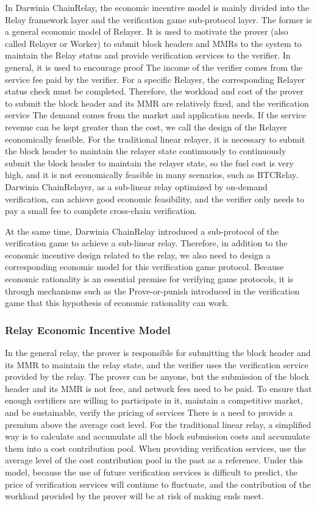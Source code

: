 In Darwinia ChainRelay, the economic incentive model is mainly divided into the Relay framework layer and the verification game sub-protocol layer.
The former is a general economic model of Relayer. It is used to motivate the prover (also called Relayer or Worker) to submit block headers and MMRs to the system to maintain the Relay status and provide verification services to the verifier. In general, it is used to encourage proof The income of the verifier comes from the service fee paid by the verifier. For a specific Relayer, the corresponding Relayer status check must be completed. Therefore, the workload and cost of the prover to submit the block header and its MMR are relatively fixed, and the verification service The demand comes from the market and application needs. If the service revenue can be kept greater than the cost, we call the design of the Relayer economically feasible. For the traditional linear relayer, it is necessary to submit the block header to maintain the relayer state continuously to continuously submit the block header to maintain the relayer state, so the fuel cost is very high, and it is not economically feasible in many scenarios, such as BTCRelay. Darwinia ChainRelayer, as a sub-linear relay optimized by on-demand verification, can achieve good economic feasibility, and the verifier only needs to pay a small fee to complete cross-chain verification.

At the same time, Darwinia ChainRelay introduced a sub-protocol of the verification game to achieve a sub-linear relay. Therefore, in addition to the economic incentive design related to the relay, we also need to design a corresponding economic model for this verification game protocol. Because economic rationality is an essential premise for verifying game protocols, it is through mechanisms such as the Prove-or-punish introduced in the verification game that this hypothesis of economic rationality can work.

\subsubsection*{Relay Economic Incentive Model}

In the general relay, the prover is responsible for submitting the block header and its MMR to maintain the relay state, and the verifier uses the verification service provided by the relay. The prover can be anyone, but the submission of the block header and its MMR is not free, and network fees need to be paid. To ensure that enough certifiers are willing to participate in it, maintain a competitive market, and be sustainable, verify the pricing of services There is a need to provide a premium above the average cost level. For the traditional linear relay, a simplified way is to calculate and accumulate all the block submission costs and accumulate them into a cost contribution pool. When providing verification services, use the average level of the cost contribution pool in the past as a reference. Under this model, because the use of future verification services is difficult to predict, the price of verification services will continue to fluctuate, and the contribution of the workload provided by the prover will be at risk of making ends meet.


